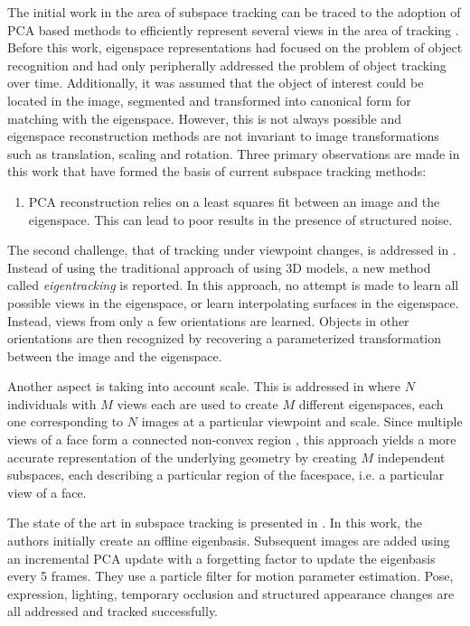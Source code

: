 \documentclass[12pt,letterpaper,doublespaced,ETD]{gt-ece-thesis} %
\begin{document}
\begin{Body}
The initial work in the area of subspace tracking can be traced to the adoption of PCA based methods to efficiently represent several views \cite{1995_JNL_ActiveModels_Cootes, 1991_CNF_Eigenfaces_Turk} in the area of tracking \cite{1998_JNL_Eigentracking_Black}.  Before this work, eigenspace representations had focused on the problem of object recognition and had only peripherally addressed the problem of object tracking over time.  Additionally, it was assumed that the object of interest could be located in the image, segmented and transformed into canonical form for matching with the eigenspace.  However, this is not always possible and eigenspace reconstruction methods are not invariant to image transformations such as translation, scaling and rotation.  Three primary observations are made in this work that have formed the basis of current subspace tracking methods:

\begin{enumerate}
\item PCA reconstruction relies on a least squares fit between an image and the eigenspace.  This can lead to poor results in the presence of structured noise.
\end{enumerate}


The second challenge, that of tracking under viewpoint changes, is addressed in  \cite{1998_JNL_Eigentracking_Black}.  Instead of using the traditional approach of using 3D models, a new method called \emph{eigentracking} is reported.  In this approach, no attempt is made to learn all possible views in the eigenspace, or learn interpolating surfaces in the eigenspace.  Instead, views from only a few orientations are learned.  Objects in other orientations are then recognized by recovering a parameterized transformation between the image and the eigenspace. 

Another aspect is taking into account scale.  This is addressed in \cite{1997_JNL_EigenTRK_Moghaddam} where $N$ individuals with $M$ views each are used to create $M$ different eigenspaces, each one corresponding to $N$ images at a particular viewpoint and scale.  Since multiple views of a face form a connected non-convex region \cite{1994_JNL_FaceTop_Bichsel}, this approach yields a more accurate representation of the underlying geometry by creating $M$ independent subspaces, each describing a particular region of the facespace, i.e. a particular view of a face.  

The state of the art in subspace tracking is presented in \cite{2008_JNL_subspaceTRK_Ross}.  In this work, the authors initially create an offline eigenbasis.  Subsequent images are added using an incremental PCA update with a forgetting factor to update the eigenbasis every 5 frames.  They use a particle filter for motion parameter estimation.  Pose, expression, lighting, temporary occlusion and structured appearance changes are all addressed and tracked successfully.


\end{Body}
\end{document}
